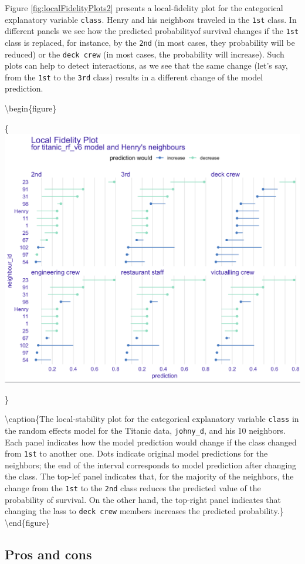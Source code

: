 \documentclass[12pt,]{krantz}
\begin{document}
Figure \ref{fig:localFidelityPlots2} presents a local-fidelity plot for the categorical explanatory variable \texttt{class}. Henry and his neighbors traveled in the \texttt{1st} class. In different panels we see how the predicted probabilityof survival changes if the \texttt{1st} class is replaced, for instance, by the \texttt{2nd} (in most cases, they probability will be reduced) or the \texttt{deck\ crew} (in most cases, the probability will increase). Such plots can help to detect interactions, as we see that the same change (let's say, from the \texttt{1st} to the \texttt{3rd} class) results in a different change of the model prediction.

\textbackslash{}begin\{figure\}

\{\centering \includegraphics[width=0.7\linewidth]{figure/cp_fidelity_2}

\}

\textbackslash{}caption\{The local-stability plot for the categorical explanatory variable \texttt{class} in the random effects model for the Titanic data, \texttt{johny\_d}, and his 10 neighbors. Each panel indicates how the model prediction would change if the class changed from \texttt{1st} to another one. Dots indicate original model predictions for the neighbors; the end of the interval corresponds to model prediction after changing the class. The top-lef panel indicates that, for the majority of the neighbors, the change from the \texttt{1st} to the \texttt{2nd} class reduces the predicted value of the probability of survival. On the other hand, the top-right panel indicates that changing the lass to \texttt{deck\ crew} members increases the predicted probability.\}\label{fig:localFidelityPlots2}
\textbackslash{}end\{figure\}

\hypertarget{cPLocDiagProsCons}{%
\subsection{Pros and cons}\label{cPLocDiagProsCons}}
\end{document}
